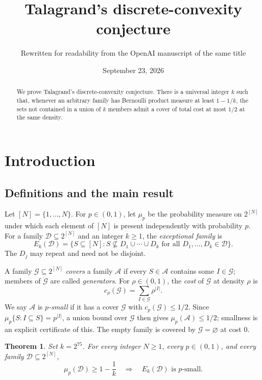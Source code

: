 \documentclass[11pt,letterpaper]{article}
\title{Talagrand's discrete-convexity conjecture}
\author{Rewritten for readability from the OpenAI manuscript of the same title}
\date{September 23, 2026}
\newtheorem{theorem}{Theorem}[section]
\theoremstyle{definition}
\theoremstyle{remark}
\numberwithin{equation}{section}
\begin{document}
\maketitle
\begin{abstract}
We prove Talagrand's discrete-convexity conjecture.
There is a universal integer $k$ such that, whenever an arbitrary family has
Bernoulli product measure at least $1-1/k$, the sets not contained
in a union of $k$ members admit a cover of total cost at most $1/2$
at the same density.
\end{abstract}

\section{Introduction}
\label{sec:introduction}

\subsection{Definitions and the main result}

Let $[N]=\{1,\ldots,N\}$. For $p\in(0,1)$, let $\mu_p$ be the probability measure on $2^{[N]}$ under which each element of $[N]$ is present independently with probability $p$. For a family $\mathcal D\subseteq2^{[N]}$ and an integer $k\ge1$, the \emph{exceptional family} is
\begin{equation}
\label{eq:exceptional-definition}
E_k(\mathcal D)
=\bigl\{S\subseteq[N]:
  S\nsubseteq D_1\cup\cdots\cup D_k
  \text{ for all }D_1,\ldots,D_k\in\mathcal D\bigr\}.
\end{equation}
The $D_j$ may repeat and need not be disjoint.

A family $\mathcal G\subseteq2^{[N]}$ \emph{covers} a family $\mathcal A$ if every $S\in\mathcal A$ contains some $I\in\mathcal G$; members of $\mathcal G$ are called \emph{generators}. For $\rho\in(0,1)$, the \emph{cost} of $\mathcal G$ at density $\rho$ is
\[
c_\rho(\mathcal G)=\sum_{I\in\mathcal G}\rho^{|I|}.
\]
We say $\mathcal A$ is \emph{$p$-small} if it has a cover $\mathcal G$ with $c_p(\mathcal G)\le1/2$. Since $\mu_p\{S:I\subseteq S\}=p^{|I|}$, a union bound over $\mathcal G$ then gives $\mu_p(\mathcal A)\le1/2$; smallness is an explicit certificate of this. The empty family is covered by $\mathcal G=\varnothing$ at cost $0$.

\begin{theorem}
\label{thm:main}
Set $k=2^{75}$. For every integer $N\ge1$, every $p\in(0,1)$, and every
family $\mathcal D\subseteq2^{[N]}$,
\[
\mu_p(\mathcal D)\ge1-\frac1k
\quad\Longrightarrow\quad
E_k(\mathcal D)\text{ is }p\text{-small}.
\]
\end{theorem}
\end{document}
